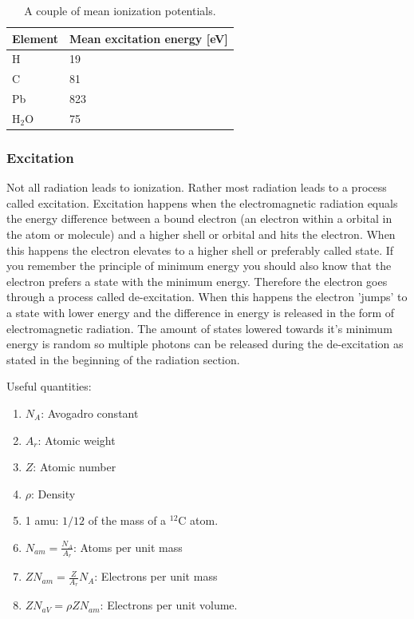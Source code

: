 \documentclass[jmp, amsmath, amssymb, reprint]{article}
\numberwithin{equation}{section}
\begin{document}
\begin{multicols}{2}
\begin{table}[H]
  \begin{center}
    \begin{tabular}{| l | l |}
   	\hline
	Element & Mean excitation energy [eV]\\ \hline
	H & 19\\
	C & 81\\
	Pb & 823\\
	H\(_2\)O & 75\\ \hline
	\end{tabular}
    \caption{A couple of mean ionization potentials.}
    \label{tabel:5}
  \end{center}
\end{table}

\subsubsection{Excitation}

Not all radiation leads to ionization. Rather most radiation leads to a process called excitation. Excitation happens when the electromagnetic radiation equals the energy difference between a bound electron (an electron within a orbital in the atom or molecule) and a higher shell or orbital and hits the electron. When this happens the electron elevates to a higher shell or preferably called state. If you remember the principle of minimum energy you should also know that the electron prefers a state with the minimum energy. Therefore the electron goes through a process called de-excitation. When this happens the electron 'jumps' to a state with lower energy and the difference in energy is released in the form of electromagnetic radiation. The amount of states lowered towards it's minimum energy is random so multiple photons can be released during the de-excitation as stated in the beginning of the radiation section.

Useful quantities:
\begin{enumerate}
\item \(N_A\): Avogadro constant
\item \(A_r\): Atomic weight
\item \(Z\): Atomic number
\item \(\rho\): Density
\item 1 amu: \(1/12\) of the mass of a \(^{12}\)C atom.
\item \(N_{am}=\frac{N_A}{A_r}\): Atoms per unit mass
\item \(ZN_{am}=\frac{Z}{A_r}N_A\): Electrons per unit mass
\item \(ZN_{aV}=\rho ZN_{am}\): Electrons per unit volume.
\end{enumerate}


\end{multicols}
\end{document}
